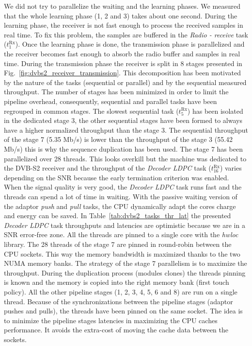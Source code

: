 We did not try to parallelize the waiting and the learning phases. We measured
that the whole learning phase (1, 2 and 3) takes about one second. During the
learning phase, the receiver is not fast enough to process the received samples
in real time. To fix this problem, the samples are buffered in the \emph{Radio -
receive} task ($t^\text{Rx}_{1}$). Once the learning phase is done, the
transmission phase is parallelized and the receiver becomes fast enough to
absorb the radio buffer and samples in real time. During the transmission phase
the receiver is split in 8 stages presented in
Fig.~\ref{fig:dvbs2_receiver_transmission}. This decomposition has been
motivated by the nature of the tasks (sequential or parallel) and by the
sequential measured throughput. The number of stages has been minimized in order
to limit the pipeline overhead, consequently, sequential and parallel tasks
have been regrouped in common stages. The slowest sequential task
($t^\text{Rx}_{5}$) has been isolated in the dedicated stage 3, the other
sequential stages have been formed to always have a higher normalized throughput
than the stage 3. The sequential throughput of the stage 7 (5.35 Mb/s) is lower
than the throughput of the stage 3 (55.42 Mb/s) this is why the sequence
duplication has been used. The stage 7 has been parallelized over 28 threads.
This looks overkill but the machine was dedicated to the DVB-S2 receiver
and the throughput of the \emph{Decoder LDPC} task ($t^\text{Rx}_{16}$) varies
depending on the SNR because the early termination criterion was enabled.
When the signal quality is very good, the \emph{Decoder LDPC} task runs fast
and the threads can spend a lot of time in waiting. With the passive waiting
version of the adaptor \emph{push} and \emph{pull} tasks, the CPU dynamically
adapt the cores charge and energy can be saved. In
Table~\ref{tab:dvbs2_tasks_thr_lat} the presented \emph{Decoder LDPC} task
throughputs and latencies are optimistic because we are in a SNR error-free
zone. All the threads are pinned to a single core with the \emph{hwloc} library.
The 28 threads of the stage 7 are pinned in round-robin between the CPU sockets.
This way the memory bandwidth is maximized thanks to the two NUMA memory banks.
The strategy of the stage 7 parallelism is to maximize the throughput. During
the duplication process (modules clones) the threads pinning is known and the
memory is copied into the right memory bank (first touch policy). All the other
pipeline stages (1, 2, 3, 4, 5, 6 and 8) are run on a single thread. Because of
the synchronizations between the pipeline stages (adaptor pushes and pulls), the
threads have been pinned on the same socket. The idea is to minimize the
pipeline stages latencies in maximizing the CPU caches performance. It avoids
the extra-cost of moving the cache data between the sockets.

